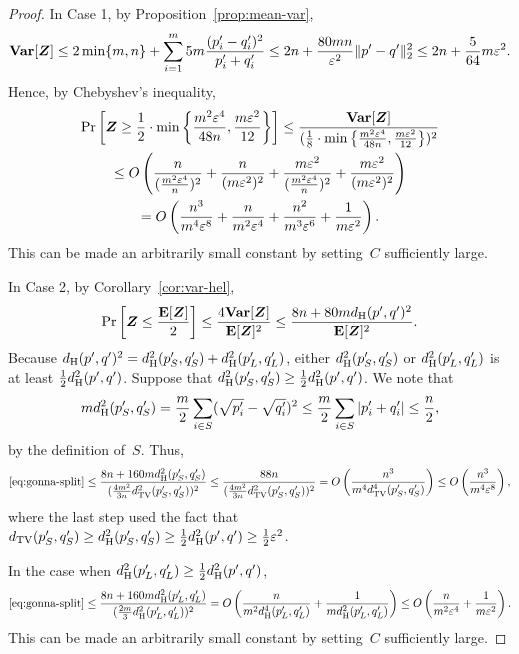 \begin{proof}
In Case 1, by Proposition~\ref{prop:mean-var},
\begin{equation*}
\mbox{\bf Var}[\boldsymbol{Z}]
\leq 2 \min\{m, n\} + \sum_{i=1}^m 5m \frac{(p_i' - q_i')^2}{p_i' + q_i'}
\leq 2 n + \frac{80 m n}{\varepsilon^2} \Vert p' - q' \Vert_2^2
\leq 2 n + \frac{5}{64}m \varepsilon^2.
\end{equation*}
Hence, by Chebyshev's inequality,
\begin{multline*}
\Pr\left[\boldsymbol{Z} \geq\frac{1}{2} \cdot \min\left\{\frac{m^2\varepsilon^4}{48n}, \frac{m\varepsilon^2}{12}\right\}\right]
\leq \frac{\mbox{\bf Var}[\boldsymbol{Z}]}{(\frac{1}{8} \cdot \min\left\{\frac{m^2\varepsilon^4}{48n}, \frac{m\varepsilon^2}{12}\right\})^2}\\
\leq O\left(\frac{n}{(\frac{m^2 \varepsilon^4}{n})^2} + \frac{n}{(m \varepsilon^2)^2}
	+ \frac{m\varepsilon^2}{(\frac{m^2 \varepsilon^4}{n})^2} + \frac{m\varepsilon^2}{(m\varepsilon^2)^2}\right)\\
= O\left(\frac{n^3}{m^4 \varepsilon^8} + \frac{n}{m^2 \varepsilon^4}
	+ \frac{n^2}{m^3 \varepsilon^6} + \frac{1}{m\varepsilon^2}\right).
\end{multline*}
This can be made an arbitrarily small constant by setting~$C$ sufficiently large.


In Case 2, by Corollary~\ref{cor:var-hel},
\begin{equation}\label{eq:gonna-split}
\Pr\left[\boldsymbol{Z} \leq \frac{\mbox{\bf E}[\boldsymbol{Z}]}{2} \right]
\leq \frac{4 \mbox{\bf Var}[\boldsymbol{Z}]}{\mbox{\bf E}[\boldsymbol{Z}]^2}
\leq \frac{8 n + 80 md_{\mathrm {H}}(p',q')^2}{\mbox{\bf E}[\boldsymbol{Z}]^2}.
\end{equation}
Because $d_{\mathrm {H}}(p',q')^2 = d_{\mathrm {H}}^2(p_S',q_S') + d_{\mathrm {H}}^2(p_L',q_L')$,
either $d_{\mathrm {H}}^2(p_S',q_S')$ or $d_{\mathrm {H}}^2(p_L',q_L')$ is at least $\frac{1}{2}d_{\mathrm {H}}^2(p',q')$.
Suppose that $d_{\mathrm {H}}^2(p_S',q_S') \geq \frac{1}{2}d_{\mathrm {H}}^2(p',q')$.
We note that
\begin{equation*}
m d_{\mathrm {H}}^2(p_S',q_S')
= \frac{m}{2} \sum_{i \in S} (\sqrt{p_i'} - \sqrt{q_i'})^2
\leq \frac{m}{2} \sum_{i \in S} |p_i' + q_i'|
\leq \frac{n}{2},
\end{equation*}
by the definition of~$S$.
Thus,
\begin{equation*}
\eqref{eq:gonna-split}
\leq \frac{8n + 160 m d_{\mathrm {H}}^2(p_S',q_S')}{(\frac{4m^2}{3n}d_{\mathrm {TV}}^2(p_S',q_S'))^2}
\leq \frac{88n}{(\frac{4m^2}{3n}d_{\mathrm {TV}}^2(p_S',q_S'))^2}
= O\left(\frac{n^3}{m^4 d_{\mathrm {TV}}^4(p_S',q_S')}\right)
\leq O\left(\frac{n^3}{m^4 \varepsilon^8}\right),
\end{equation*}
where the last step used the fact that $d_{\mathrm {TV}}(p_S',q_S') \geq d_{\mathrm {H}}^2(p_S',q_S') \geq \frac{1}{2}d_{\mathrm {H}}^2(p',q') \geq \frac{1}{2}\varepsilon^2$.

In the case when $d_{\mathrm {H}}^2(p_L',q_L') \geq \frac{1}{2} d_{\mathrm {H}}^2(p',q')$,
\begin{equation*}
\eqref{eq:gonna-split}
\leq \frac{8n + 160 m d_{\mathrm {H}}^2(p_L',q_L')}{(\frac{2m}{3} d_{\mathrm {H}}^2(p_L',q_L'))^2}
= O\left(\frac{n}{m^2 d_{\mathrm {H}}^4(p_L',q_L')} + \frac{1}{m d_{\mathrm {H}}^2(p_L',q_L')}\right)
\leq O\left(\frac{n}{m^2 \varepsilon^4} + \frac{1}{m \varepsilon^2}\right).
\end{equation*}
This can be made an arbitrarily small constant by setting~$C$ sufficiently large.
\end{proof}
